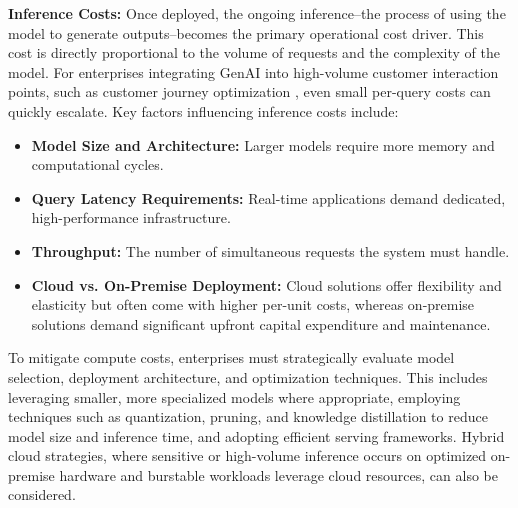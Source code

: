 \documentclass[10pt,journal,compsoc,twocolumn]{IEEEtran}
\begin{document}
\textbf{Inference Costs:} Once deployed, the ongoing inference--the process of using the model to generate outputs--becomes the primary operational cost driver. This cost is directly proportional to the volume of requests and the complexity of the model. For enterprises integrating GenAI into high-volume customer interaction points, such as customer journey optimization \cite{openalex_w4400993506}, even small per-query costs can quickly escalate. Key factors influencing inference costs include:
\begin{itemize}
  \item \textbf{Model Size and Architecture:} Larger models require more memory and computational cycles.
  \item \textbf{Query Latency Requirements:} Real-time applications demand dedicated, high-performance infrastructure.
  \item \textbf{Throughput:} The number of simultaneous requests the system must handle.
  \item \textbf{Cloud vs. On-Premise Deployment:} Cloud solutions offer flexibility and elasticity but often come with higher per-unit costs, whereas on-premise solutions demand significant upfront capital expenditure and maintenance.
\end{itemize}

To mitigate compute costs, enterprises must strategically evaluate model selection, deployment architecture, and optimization techniques. This includes leveraging smaller, more specialized models where appropriate, employing techniques such as quantization, pruning, and knowledge distillation to reduce model size and inference time, and adopting efficient serving frameworks. Hybrid cloud strategies, where sensitive or high-volume inference occurs on optimized on-premise hardware and burstable workloads leverage cloud resources, can also be considered.
\end{document}
